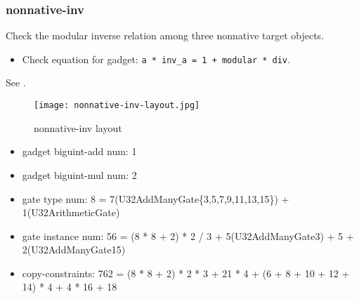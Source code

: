 \subsubsection{nonnative-inv}

Check the modular inverse relation among three nonnative target objects.

\begin{itemize}
    \item Check equation for gadget: \verb|a * inv_a = 1 + modular * div|.
\end{itemize}

See .
\begin{figure}[!ht]
    \centering
    \texttt{[image: nonnative-inv-layout.jpg]}
    \caption{nonnative-inv layout}
    \label{fig:nonnative-inv-layout}
\end{figure}

\begin{itemize}
    \item gadget biguint-add num: 1
    \item gadget biguint-mul num: 2
    \item gate type num: 8 = 7(U32AddManyGate\{3,5,7,9,11,13,15\}) + 1(U32ArithmeticGate)
    \item gate instance num: 56 = (8 * 8 + 2) * 2 / 3 + 5(U32AddManyGate{3}) + 5 + 2(U32AddManyGate{15})
    \item copy-constraints: 762 = (8 * 8 + 2) * 2 * 3 + 21 * 4 + (6 + 8 + 10 + 12 + 14) * 4 + 4 * 16 + 18
\end{itemize}
